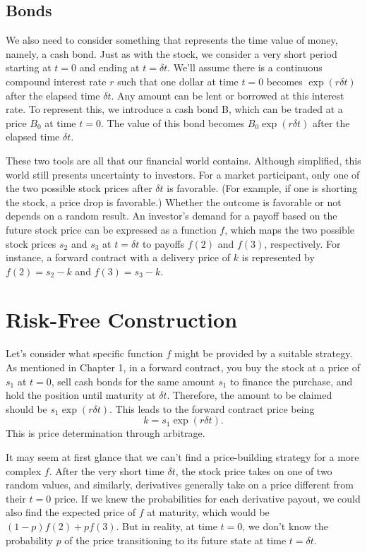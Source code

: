 \documentclass[uplatex,a4j,12pt,dvipdfmx]{jsarticle}
\begin{document}
\subsection{Bonds}
We also need to consider something that represents the time value of money, namely, a cash bond. Just as with the stock, we consider a very short period starting at $t=0$ and ending at $t=\delta t$. We'll assume there is a continuous compound interest rate $r$ such that one dollar at time $t=0$ becomes $\exp(r\delta t)$ after the elapsed time $\delta t$. Any amount can be lent or borrowed at this interest rate. To represent this, we introduce a cash bond B, which can be traded at a price $B_0$ at time $t=0$. The value of this bond becomes $B_0 \exp(r\delta t)$ after the elapsed time $\delta t$.

These two tools are all that our financial world contains. Although simplified, this world still presents uncertainty to investors. For a market participant, only one of the two possible stock prices after $\delta t$ is favorable. (For example, if one is shorting the stock, a price drop is favorable.) Whether the outcome is favorable or not depends on a random result. An investor's demand for a payoff based on the future stock price can be expressed as a function $f$, which maps the two possible stock prices $s_2$ and $s_3$ at $t=\delta t$ to payoffs $f(2)$ and $f(3)$, respectively. For instance, a forward contract with a delivery price of $k$ is represented by $f(2)=s_2-k$ and $f(3)=s_3-k$.

\section{Risk-Free Construction}
Let's consider what specific function $f$ might be provided by a suitable strategy. As mentioned in Chapter 1, in a forward contract, you buy the stock at a price of $s_1$ at $t=0$, sell cash bonds for the same amount $s_1$ to finance the purchase, and hold the position until maturity at $\delta t$. Therefore, the amount to be claimed should be $s_1 \exp(r\delta t)$. This leads to the forward contract price being \[k = s_1 \exp(r\delta t).\] This is price determination through arbitrage.

It may seem at first glance that we can't find a price-building strategy for a more complex $f$. After the very short time $\delta t$, the stock price takes on one of two random values, and similarly, derivatives generally take on a price different from their $t=0$ price. If we knew the probabilities for each derivative payout, we could also find the expected price of $f$ at maturity, which would be $(1-p)f(2) + pf(3)$. But in reality, at time $t=0$, we don't know the probability $p$ of the price transitioning to its future state at time $t=\delta t$.
\end{document}
